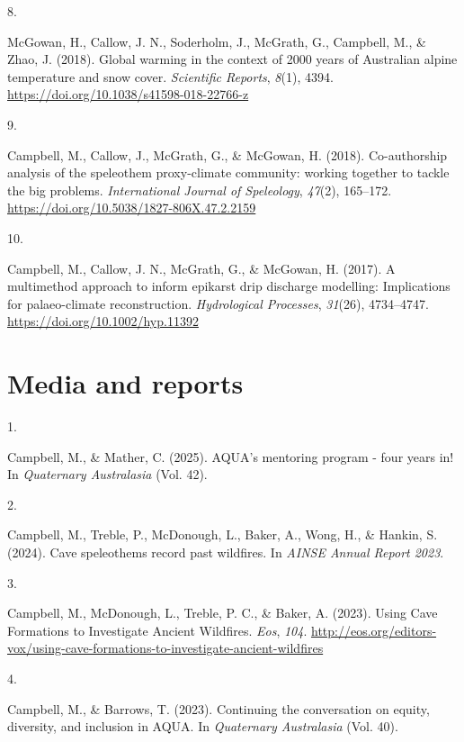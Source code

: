 \documentclass[11pt,a4paper,]{moderncv}
\newlength{\csllabelwidth}
\newcommand{\CSLLeftMargin}[1]{\parbox[t]{\csllabelwidth}{#1}}
\newcommand{\CSLRightInline}[1]{\parbox[t]{\linewidth - \csllabelwidth}{#1}}
\begin{document}
\leavevmode{}%
\CSLLeftMargin{8. }%
\CSLRightInline{McGowan, H., Callow, J. N., Soderholm, J., McGrath, G.,
Campbell, M., \& Zhao, J. (2018). Global warming in the context of 2000
years of Australian alpine temperature and snow cover. \emph{Scientific
Reports}, \emph{8}(1), 4394.
\url{https://doi.org/10.1038/s41598-018-22766-z}}

\leavevmode{}%
\CSLLeftMargin{9. }%
\CSLRightInline{Campbell, M., Callow, J., McGrath, G., \& McGowan, H.
(2018). Co-authorship analysis of the speleothem proxy-climate
community: working together to tackle the big problems.
\emph{International Journal of Speleology}, \emph{47}(2), 165--172.
\url{https://doi.org/10.5038/1827-806X.47.2.2159}}

\leavevmode{}%
\CSLLeftMargin{10. }%
\CSLRightInline{Campbell, M., Callow, J. N., McGrath, G., \& McGowan, H.
(2017). A multimethod approach to inform epikarst drip discharge
modelling: Implications for palaeo-climate reconstruction.
\emph{Hydrological Processes}, \emph{31}(26), 4734--4747.
\url{https://doi.org/10.1002/hyp.11392}}

\newpage

\hypertarget{media-and-reports}{%
\section{Media and reports}\label{media-and-reports}}

\hypertarget{bibliography}{}
\leavevmode{}%
\CSLLeftMargin{1. }%
\CSLRightInline{Campbell, M., \& Mather, C. (2025). AQUA's mentoring
program - four years in! In \emph{Quaternary Australasia} (Vol. 42).}

\leavevmode{}%
\CSLLeftMargin{2. }%
\CSLRightInline{Campbell, M., Treble, P., McDonough, L., Baker, A.,
Wong, H., \& Hankin, S. (2024). Cave speleothems record past wildfires.
In \emph{AINSE Annual Report 2023}.}

\leavevmode{}%
\CSLLeftMargin{3. }%
\CSLRightInline{Campbell, M., McDonough, L., Treble, P. C., \& Baker, A.
(2023). Using Cave Formations to Investigate Ancient Wildfires.
\emph{Eos}, \emph{104}.
\url{http://eos.org/editors-vox/using-cave-formations-to-investigate-ancient-wildfires}}

\leavevmode{}%
\CSLLeftMargin{4. }%
\CSLRightInline{Campbell, M., \& Barrows, T. (2023). Continuing the
conversation on equity, diversity, and inclusion in AQUA. In
\emph{Quaternary Australasia} (Vol. 40).}
\end{document}
